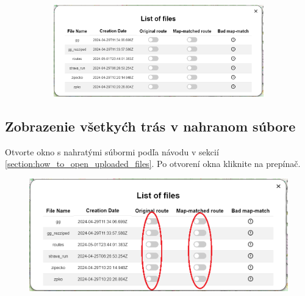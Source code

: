 \begin{figure}[H]
\begin{subfigure}{0.2\textwidth}
    \end{subfigure}
    \begin{subfigure}{0.78\textwidth}
        \centering
        \includegraphics[width=1\textwidth]{guide_includes/img/uploaded_files_window.png}
    \end{subfigure}
\end{figure}

\subsection{Zobrazenie všetkyćh trás v nahranom súbore}
Otvorte okno s nahratými súbormi podľa návodu v sekcií \ref{section:how_to_open_uploaded_files}. Po otvorení okna kliknite na prepínač.
\begin{figure}[H]
    \centering
    \includegraphics[width=1\textwidth]{guide_includes/img/toggle_all_routes.png}
\end{figure}

\pagebreak
